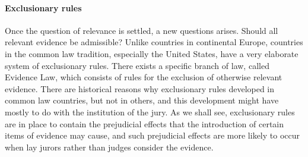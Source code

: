 \documentclass[10pt]{article}
\begin{document}









\paragraph{Exclusionary rules} 
Once the question of relevance is settled, a new questions arises. Should all relevant 
evidence be admissible? Unlike countries in continental Europe, countries in the common law tradition, especially the United States, have a very elaborate system of exclusionary rules. There exists a specific branch of law, called Evidence Law, which consists of rules for the exclusion of otherwise relevant evidence.  There are historical reasons why exclusionary rules developed in common law countries, but not in others, 
and this development might have mostly to do with the institution of the jury. 
As we shall see, exclusionary rules are in place to contain the prejudicial effects that the introduction of certain items of evidence may cause, and such prejudicial effects are more likely to occur when lay jurors rather than judges consider the evidence. 
\end{document}
